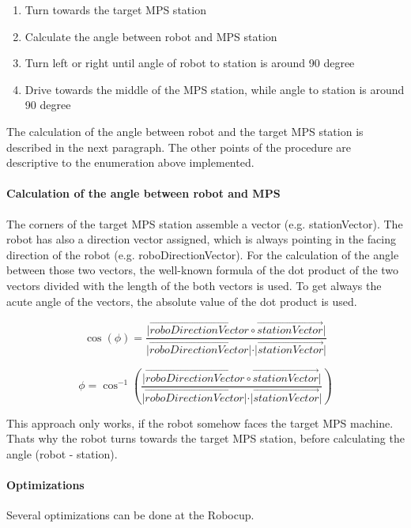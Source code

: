 \begin{enumerate}
\item Turn towards the target MPS station
\item Calculate the angle between robot and MPS station
\item Turn left or right until angle of robot to station is around 90 degree
\item Drive towards the middle of the MPS station, while angle to station is around 90 degree
\end{enumerate}

The calculation of the angle between robot and the target MPS station is described in the next paragraph. The other points of the procedure are descriptive to the enumeration above implemented.

\paragraph{Calculation of the angle between robot and MPS}

The corners of the target MPS station assemble a vector (e.g. stationVector). The robot has also a direction vector assigned, which is always pointing in the facing direction of the robot (e.g. roboDirectionVector). For the calculation of the angle between those two vectors, the well-known formula of the dot product of the two vectors divided with the length of the both vectors is used. To get always the acute angle of the vectors, the absolute value of the dot product is used. 

\begin{equation}
\cos(\phi) = \frac{ \vert \overrightarrow{roboDirectionVector} \circ \overrightarrow{stationVector} \vert} { \vert \overrightarrow{roboDirectionVector}  \vert  \cdot \vert \overrightarrow{stationVector}  \vert}
\end{equation}

\begin{equation}
\phi = \cos ^{ - 1} \left( \frac{ \vert \overrightarrow{roboDirectionVector} \circ \overrightarrow{stationVector} \vert} { \vert \overrightarrow{roboDirectionVector}  \vert  \cdot \vert \overrightarrow{stationVector}  \vert} \right)
\end{equation}


This approach only works, if the robot somehow faces the target MPS machine. Thats why the robot turns towards the target MPS station, before calculating the angle (robot - station). 


\paragraph{Optimizations}
Several optimizations can be done at the Robocup. 

